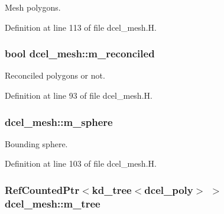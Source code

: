 Mesh polygons. 



Definition at line 113 of file dcel\+\_\+mesh.\+H.

\subsubsection[{\texorpdfstring{m\+\_\+reconciled}{m_reconciled}}]{\setlength{\rightskip}{0pt plus 5cm}bool dcel\+\_\+mesh\+::m\+\_\+reconciled\hspace{0.3cm}{\ttfamily [protected]}}\hypertarget{classdcel__mesh_a93a9f77ca015481e814e69ba5aa31c71}{}\label{classdcel__mesh_a93a9f77ca015481e814e69ba5aa31c71}


Reconciled polygons or not. 



Definition at line 93 of file dcel\+\_\+mesh.\+H.

\subsubsection[{\texorpdfstring{m\+\_\+sphere}{m_sphere}}]{ dcel\+\_\+mesh\+::m\+\_\+sphere\hspace{0.3cm}{\ttfamily [protected]}}\hypertarget{classdcel__mesh_a80f33c16d6a90f75f6c89353a489455f}{}\label{classdcel__mesh_a80f33c16d6a90f75f6c89353a489455f}


Bounding sphere. 



Definition at line 103 of file dcel\+\_\+mesh.\+H.

\subsubsection[{\texorpdfstring{m\+\_\+tree}{m_tree}}]{\setlength{\rightskip}{0pt plus 5cm}Ref\+Counted\+Ptr$<${\bf kd\+\_\+tree}$<${\bf dcel\+\_\+poly}$>$ $>$ dcel\+\_\+mesh\+::m\+\_\+tree\hspace{0.3cm}{\ttfamily [protected]}}\hypertarget{classdcel__mesh_a135bbb6ed1ef01831c3039aafab9c212}{}\label{classdcel__mesh_a135bbb6ed1ef01831c3039aafab9c212}


